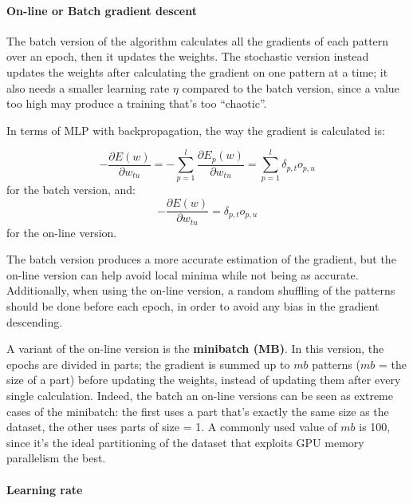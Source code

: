 \paragraph{On-line or Batch gradient descent}

The batch version of the algorithm calculates all the gradients of each pattern over an epoch, then it updates the weights. The stochastic version instead updates the weights after calculating the gradient on one pattern at a time; it also needs a smaller learning rate $\eta$ compared to the batch version, since a value too high may produce a training that's too ``chaotic''.

In terms of MLP with backpropagation, the way the gradient is calculated is:

\begin{equation*}
    - \dfrac{\partial E(w)}{\partial w_{tu}} = - \sum_{p=1}^l \dfrac{\partial E_p(w)}{\partial w_{tu}} = \sum_{p=1}^l \delta_{p,t} o_{p,u}
\end{equation*}
for the batch version, and:
\begin{equation*}
    - \dfrac{\partial E(w)}{\partial w_{tu}} = \delta_{p,t} o_{p,u}
\end{equation*}
for the on-line version.

The batch version produces a more accurate estimation of the gradient, but the on-line version can help avoid local minima while not being as accurate. Additionally, when using the on-line version, a random shuffling of the patterns should be done before each epoch, in order to avoid any bias in the gradient descending.

A variant of the on-line version is the \textbf{minibatch (MB)}. In this version, the epochs are divided in parts; the gradient is summed up to $mb$ patterns ($mb$ = the size of a part) before updating the weights, instead of updating them after every single calculation. Indeed, the batch an on-line versions can be seen as extreme cases of the minibatch: the first uses a part that's exactly the same size as the dataset, the other uses parts of size = 1. A commonly used value of $mb$ is 100, since it's the ideal partitioning of the dataset that exploits GPU memory parallelism the best.

\paragraph{Learning rate}

